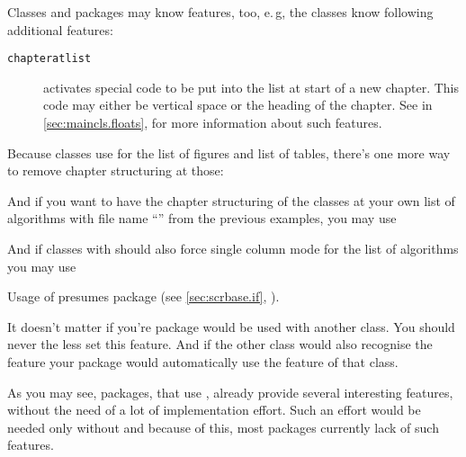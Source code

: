 Classes and packages may know features, too, e.\,g, the \KOMAScript{} classes
know following additional features:
\begin{description}
\item[\texttt{chapteratlist}] activates special code to be put into the list
  at start of a new chapter. This code may either be vertical space or the
  heading of the chapter.
  See  in
  \autoref{sec:maincls.floats},  for
  more information about such features.
\end{description}
\begin{Example}
  Because \KOMAScript{} classes use  for the list of figures
  and list of tables, there's one more way to remove chapter structuring at
  those:
\begin{lstcode}
\end{lstcode}

  And if you want to have the chapter structuring of the \KOMAScript{} classes
  at your own list of algorithms with file name 
  ``'' from the previous examples, you may use
\begin{lstcode}
\end{lstcode}
  And if classes with  should also force single column mode for
  the list of algorithms you may use
\begin{lstcode}
\end{lstcode}
  Usage of  presumes package  (see
  \autoref{sec:scrbase.if},
  ).

  It doesn't matter if you're package would be used with
  another class. You should never the less set this feature. And if the other
  class would also recognise the feature your package would automatically use
  the feature of that class.
\end{Example}
As you may see, packages, that use , already provide several
interesting features, without the need of a lot of implementation effort. Such
an effort would be needed only without  and because of this,
most packages currently lack of such features.%
%
%

